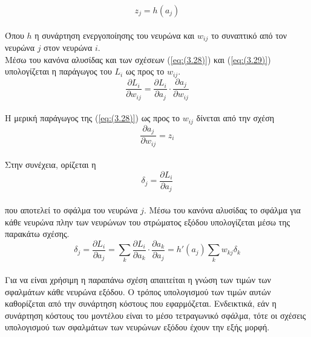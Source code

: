 \documentclass[12pt]{article}
\numberwithin{equation}{section}
\begin{document}
\begin{equation}
z_j = h(a_j)
\label{eq:(3.29)}
\end{equation}\\

\noindent Όπου \(h\) η συνάρτηση ενεργοποίησης του νευρώνα και \(w_{ij}\) το συναπτικό από τον νευρώνα \(j\) στον νευρώνα \(i\).\\

\noindent Μέσω του κανόνα αλυσίδας και των σχέσεων (\ref{eq:(3.28)}) και (\ref{eq:(3.29)}) υπολογίζεται η παράγωγος του \(L_i\) ως προς το \(w_{ij}\). \\



\begin{equation}
\frac{\partial L_i}{\partial w_{ij}} = \frac{\partial L_i}{\partial a_j} \cdot \frac{\partial a_j}{\partial w_{ij}}
\end{equation}\\

\noindent Η μερική παράγωγος της (\ref{eq:(3.28)}) ως προς το \(w_{ij}\) δίνεται από την σχέση\\

\begin{equation}
\frac{\partial a_j}{\partial w_{ij}} = z_i
\end{equation}\\

\noindent Στην συνέχεια, ορίζεται η\\

\begin{equation}
\delta_j = \frac{\partial L_i}{\partial a_j}
\end{equation}\\

\noindent που αποτελεί το σφάλμα του νευρώνα \(j\).  Μέσω του κανόνα αλυσίδας το σφάλμα για κάθε νευρώνα πλην των νευρώνων του στρώματος εξόδου  υπολογίζεται μέσω της παρακάτω σχέσης.\\

\begin{equation}
\delta_j = \frac{\partial L_i}{\partial a_j} = \sum_k \frac{\partial L_i}{\partial a_k} \cdot \frac{\partial a_k}{\partial a_j} = h'(a_j) \sum_k w_{kj} \delta_k
\label{eq:3.33}
\end{equation}\\

\noindent Για να είναι χρήσιμη η παραπάνω σχέση απαιτείται η γνώση των τιμών των σφαλμάτων κάθε νευρώνα εξόδου. Ο τρόπος υπολογισμού των τιμών αυτών καθορίζεται από την συνάρτηση κόστους που εφαρμόζεται. Ενδεικτικά, εάν η συνάρτηση κόστους του μοντέλου είναι το μέσο τετραγωνικό σφάλμα, τότε οι σχέσεις υπολογισμού των σφαλμάτων των νευρώνων εξόδου έχουν την εξής μορφή.
\end{document}
